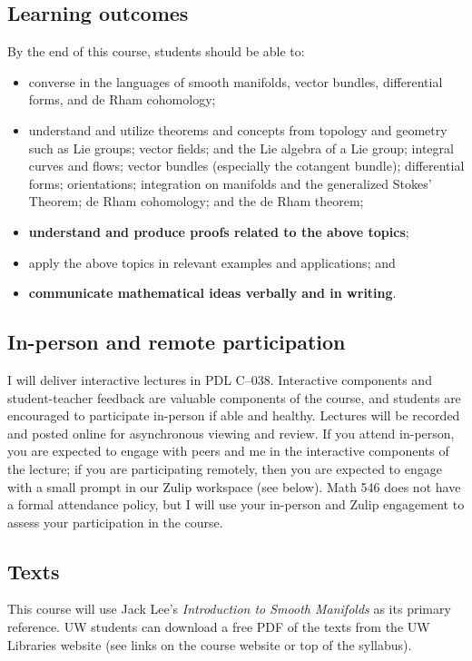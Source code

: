 \documentclass[11pt,twoside]{amsart}
\begin{document}
\subsection*{Learning outcomes}
By the end of this course, students should be able to:
\begin{itemize}
\item converse in the languages of smooth manifolds, vector bundles, differential forms, and de Rham cohomology;
\item understand and utilize theorems and concepts from topology and geometry such as Lie groups; vector fields; and the Lie algebra of a Lie group; integral curves and flows; vector bundles (especially the cotangent bundle); differential forms; orientations; integration on manifolds and the generalized Stokes' Theorem; de Rham cohomology; and the de Rham theorem;
\item \textbf{understand and produce proofs related to the above topics};
\item apply the above topics in relevant examples and applications; and
\item \textbf{communicate mathematical ideas verbally and in writing}.
\end{itemize}

\subsection*{In-person and remote participation}
I will deliver interactive lectures in PDL C--038.  Interactive components and student-teacher feedback are valuable components of the course, and students are encouraged to participate in-person if able and healthy. Lectures will be recorded and posted online for asynchronous viewing and review.  If you attend in-person, you are expected to engage with peers and me in the interactive components of the lecture; if you are participating remotely, then you are expected to engage with a small prompt in our Zulip workspace (see below). Math 546 does not have a formal attendance policy, but I will use your in-person and Zulip engagement to assess your participation in the course.

\subsection*{Texts}
This course will use Jack Lee's \emph{Introduction to Smooth Manifolds} as its primary reference. UW students can download a free PDF of the texts from the UW Libraries website (see links on the course website or top of the syllabus).
\end{document}
